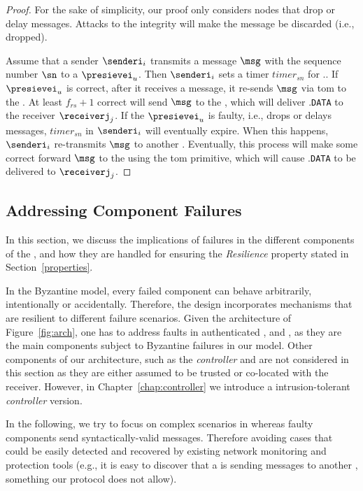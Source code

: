 \begin{proof}
For the sake of simplicity, our proof only considers nodes that drop or delay messages.
Attacks to the integrity will make the message be discarded (i.e., dropped).

Assume that a sender $\senderi_i$ transmits a message $\msg$ with the sequence number $\sn$ to a \presieve $\presievei_u$.
Then $\senderi_i$ sets a timer $timer_{sn}$ for \msg.\sn.
If $\presievei_u$ is correct, after it receives a message, it re-sends $\msg$ via \gls{tom} to the \repsieves.
At least $f_{rs}+1$ correct \repsieves will send $\msg$ to the \postsieve, which will deliver  \msg.\texttt{DATA} to the receiver $\receiverj_j$.
If the $\presievei_u$ is faulty, i.e., drops or delays messages, $timer_{sn}$ in $\senderi_i$ will eventually expire.
When this happens, $\senderi_i$ re-transmits $\msg$ to another \presieve.
Eventually, this process will make some correct \presieve forward $\msg$ to the \repsieves using the \gls{tom} primitive, which will cause \msg.\texttt{DATA} to be delivered to $\receiverj_j$.
\end{proof}


\subsection{Addressing Component Failures}
\label{sec:failures}

In this section, we discuss the implications of failures in the different components of the \sieveq, and how they are handled for ensuring the \emph{Resilience} property stated in Section~\ref{properties}.

In the Byzantine model, every failed component can behave arbitrarily, intentionally or accidentally. Therefore, the \sieveq design incorporates mechanisms that are resilient to different failure scenarios. 
Given the architecture of Figure~\ref{fig:arch}, one has to address faults in authenticated \senders, \presieves and \repsieves, as they are the main components subject to Byzantine failures in our model. 
Other components of our architecture, such as the \emph{controller} and \postsieve are not considered in this section as they are either assumed to be trusted or co-located with the receiver. 
However, in Chapter~\ref{chap:controller} we introduce a intrusion-tolerant \emph{controller} version.

In the following, we try to focus on complex scenarios in whereas faulty components send syntactically-valid messages. Therefore avoiding cases that could be easily detected and recovered by existing network monitoring and protection tools (e.g., it is easy to discover that a \presieve is sending messages to another \presieve, something our protocol does not allow).

